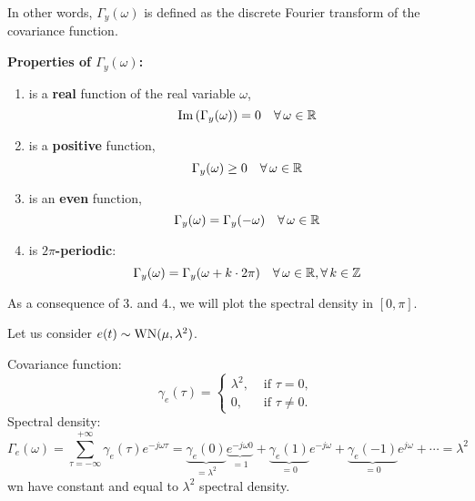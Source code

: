 In other words, $\Gamma_y(\omega)$ is defined as the discrete Fourier transform of the covariance function.

\textbf{Properties of $\Gamma_{y}(\omega)$:}
\begin{enumerate}
	\item is a \textbf{real} function of the real variable $\omega$,
	$$
		\Im\left(\Gamma_{y}(\omega)\right)=0 \quad \forall \omega \in \RR
	$$
	\item is a \textbf{positive} function,
	$$
		\Gamma_{y}(\omega) \geq 0 \quad \forall \omega \in \RR
	$$
	\item is an \textbf{even} function,
	$$
		\Gamma_{y}(\omega)=\Gamma_{y}(-\omega) \quad \forall \omega \in \RR
	$$
	\item is \textbf{$2\pi$-periodic}:
	$$
		\Gamma_{y}(\omega)=\Gamma_{y}(\omega+k \cdot 2 \pi) \quad \forall \omega \in \RR, \forall k \in \mathbb{Z}
	$$
\end{enumerate}

\begin{rem}
As a consequence of 3. and 4., we will plot the spectral density in $[0, \pi]$.
\end{rem}

\begin{exa}
	Let us consider $e(t) \sim \operatorname{WN}(\mu, \lambda^{2})$.

	Covariance function:
	\[
		\gamma_{e}(\tau) =
		\begin{cases}
			\lambda^{2}, & \text { if } \tau=0, \\
			0, & \text { if } \tau \neq 0.
		\end{cases}
	\]
	Spectral density:
	\[
		\Gamma_{e}(\omega) =\sum_{\tau=-\infty}^{+\infty} \gamma_{e}(\tau) e^{-j \omega \tau}=\underbrace{\gamma_{e}(0)}_{=\lambda^2} \underbrace{e^{-j \omega 0}}_{=1}+\underbrace{\gamma_{e}(1)}_{=0} e^{-j \omega} + \underbrace{\gamma_{e}(-1)}_{=0} e^{j \omega}+\cdots = \lambda^{2}
	\]
	\gls{wn} have constant and equal to $\lambda^{2}$ spectral density.
\end{exa}

